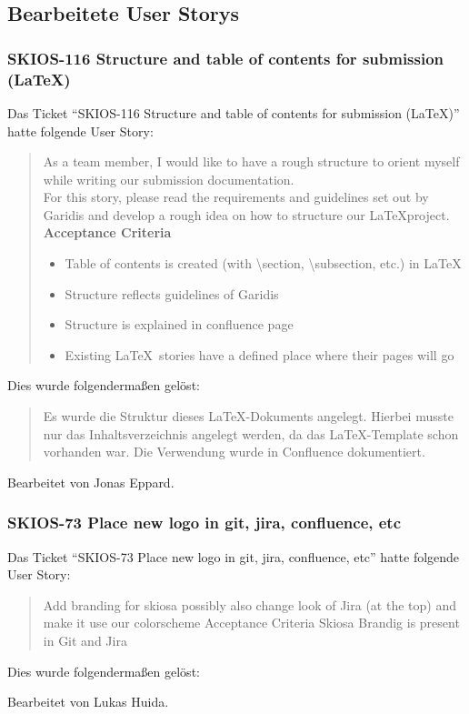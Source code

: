 \subsection{Bearbeitete User Storys}
\subsubsection{SKIOS-116 Structure and table of contents for submission (\LaTeX)}
Das Ticket \enquote{SKIOS-116 Structure and table of contents for submission (\LaTeX)}
hatte folgende User Story:
\begin{quotation}
    As a team member, I would like to have a rough structure to orient myself while writing our submission documentation.\\
    For this story, please read the requirements and guidelines set out by Garidis and develop a rough idea on how to structure our \LaTeX project.\\
    \textbf{Acceptance Criteria}
    \begin{itemize}
        \item Table of contents is created (with \textbackslash{}section, \textbackslash{}subsection, etc.) in \LaTeX
        \item Structure reflects guidelines of Garidis
        \item Structure is explained in confluence page
        \item Existing \LaTeX~stories have a defined place where their pages will go
    \end{itemize}
\end{quotation}
Dies wurde folgendermaßen gelöst:
\begin{quotation}
    Es wurde die Struktur dieses \LaTeX-Dokuments angelegt. Hierbei musste nur das Inhaltsverzeichnis
    angelegt werden, da das \LaTeX-Template schon vorhanden war.
    Die Verwendung wurde in Confluence dokumentiert.
\end{quotation}
Bearbeitet von Jonas Eppard.

\subsubsection{SKIOS-73 Place new logo in git, jira, confluence, etc}
Das Ticket \enquote{SKIOS-73 Place new logo in git, jira, confluence, etc} hatte folgende User Story:
\begin{quotation}
    Add branding for skiosa
    possibly also change look of Jira (at the top) and make it use our colorscheme
    Acceptance Criteria
    Skiosa Brandig is present in Git and Jira
\end{quotation}
Dies wurde folgendermaßen gelöst:
\begin{quotation}
    
\end{quotation}
Bearbeitet von Lukas Huida.

